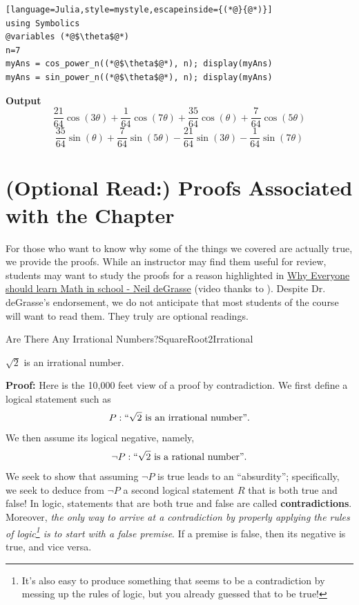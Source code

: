\bigskip

\begin{lstlisting}[language=Julia,style=mystyle,escapeinside={(*@}{@*)}]
using Symbolics
@variables (*@$\theta$@*)
n=7
myAns = cos_power_n((*@$\theta$@*), n); display(myAns)
myAns = sin_power_n((*@$\theta$@*), n); display(myAns)
\end{lstlisting}
\textbf{Output} 
$$
\frac{21}{64} \cos\left( 3 \theta \right) + \frac{1}{64} \cos\left( 7 \theta  \right) + \frac{35}{64} \cos\left( \theta \right) + \frac{7}{64} \cos\left( 5 \theta  \right)
$$
$$
\frac{35}{64} \sin\left( \theta  \right) + \frac{7}{64} \sin\left( 5 \theta  \right) - \frac{21}{64} \sin\left( 3 \theta  \right) - \frac{1}{64} \sin\left( 7 \theta  \right)
$$

\section{(Optional Read:) Proofs Associated with the Chapter}
\label{sec:PreCalcProofs}

For those who want to know why some of the things we covered are actually true, we provide the proofs.  While an instructor may find them useful for review, students may want to study the proofs for a reason highlighted in \href{https://www.youtube.com/shorts/2CvCIFPdgMo}{Why Everyone should learn Math in school - Neil deGrasse} (video thanks to \@LearnwithJaspal). Despite Dr. deGrasse's endorsement, we do not anticipate that most students of the course will want to read them. They truly are optional readings.

\begin{propColor}{Are There Any Irrational Numbers?}{SquareRoot2Irrational}


$\sqrt{2}$ is an irrational number.     
\end{propColor}

\textbf{Proof:}  Here is the 10,000 feet view of a proof by contradiction. We first define a logical statement such as 
$$P: ``\sqrt{2} \text{ is an irrational number''}.$$
We then assume its logical negative, namely, 
$$\lnot P: ``\sqrt{2} \text{ is a rational number''}.$$
We seek to show that assuming $\lnot P$ is true leads to an ``absurdity''; specifically, we seek to deduce from $\lnot P$ a second logical statement $R$ that is both true and false! In logic, statements that are both true and false are called \textbf{contradictions}. Moreover, \textit{the only way to arrive at a contradiction by properly applying the rules of logic\footnote{It's also easy to produce something that seems to be a contradiction by messing up the rules of logic, but you already guessed that to be true!} is to start with a false premise}. If a premise is false, then its negative is true, and vice versa. 

